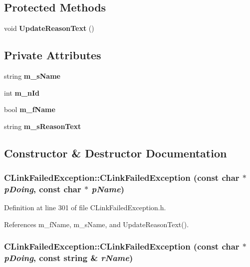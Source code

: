 \subsection*{Protected Methods}
\begin{CompactItemize}
\item 
void {\bf Update\-Reason\-Text} ()
\end{CompactItemize}
\subsection*{Private Attributes}
\begin{CompactItemize}
\item 
string {\bf m\_\-s\-Name}
\item 
int {\bf m\_\-n\-Id}
\item 
bool {\bf m\_\-f\-Name}
\item 
string {\bf m\_\-s\-Reason\-Text}
\end{CompactItemize}


\subsection{Constructor \& Destructor Documentation}
\subsubsection{\setlength{\rightskip}{0pt plus 5cm}CLink\-Failed\-Exception::CLink\-Failed\-Exception (const char $\ast$ {\em p\-Doing}, const char $\ast$ {\em p\-Name})\hspace{0.3cm}{\tt  [inline]}}\label{classCLinkFailedException_a0}




Definition at line 301 of file CLink\-Failed\-Exception.h.

References m\_\-f\-Name, m\_\-s\-Name, and Update\-Reason\-Text().
\subsubsection{\setlength{\rightskip}{0pt plus 5cm}CLink\-Failed\-Exception::CLink\-Failed\-Exception (const char $\ast$ {\em p\-Doing}, const string \& {\em r\-Name})\hspace{0.3cm}{\tt  [inline]}}\label{classCLinkFailedException_a1}





